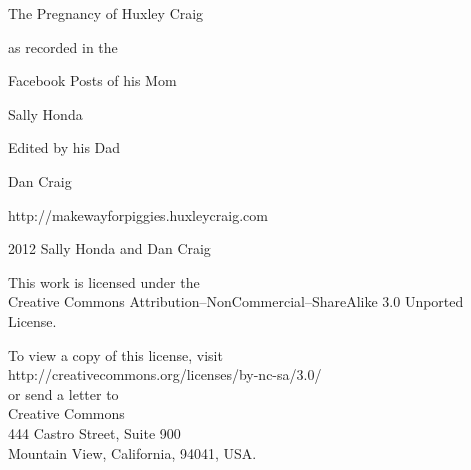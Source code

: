 \documentclass[11pt,ebook]{memoir}
\begin{document}
\frontmatter

\thispagestyle{empty}
\vspace*{1in}
\begin{center}
\end{center}

\cleardoublepage
\thispagestyle{empty}
\vspace*{\fill}
\begin{center}
\par
\vspace{1in}
\LARGE{The Pregnancy of Huxley Craig}\par
\vspace{0.25in}
\large{as recorded in the}\par
\large{Facebook Posts of his Mom}\par
\LARGE{Sally Honda}\par
\vspace{1in}
\large{Edited by his Dad}\par
\LARGE{Dan Craig}\par
\vspace{0.2in}
\large{http://makewayforpiggies.huxleycraig.com}
\end{center}
\vspace*{\fill}
\clearpage

\begingroup
\vspace*{\fill}
\footnotesize
\setlength{\parindent}{0pt}
\setlength{\parskip}{\baselineskip}
\textcopyright{} 2012 Sally Honda and Dan Craig

This work is licensed under the\\
Creative Commons Attribution--NonCommercial--ShareAlike 3.0 Unported License.

To view a copy of this license, visit \\
http://creativecommons.org/licenses/by-nc-sa/3.0/\\
or send a letter to\\
Creative Commons\\
444 Castro Street, Suite 900\\
Mountain View, California, 94041, USA.
\vspace*{\fill}
\endgroup
\clearpage

\tableofcontents
\thispagestyle{empty}
\cleardoublepage

\mainmatter

\setcounter{page}{1}
\thispagestyle{cleared}
\end{document}
